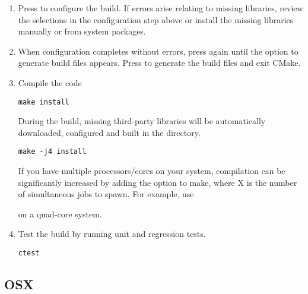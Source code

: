 \begin{enumerate}
    
    \item Press  to configure the build. If errors arise relating to
    missing libraries, review the  selections in
    the configuration step above or install the missing libraries manually or
    from system packages.
    
    \item When configuration completes without errors, press  again
    until the option  to generate build files appears. Press 
    to generate the build files and exit CMake.
    
    \item Compile the code
    \begin{lstlisting}[style=BashInputStyle]
        make install
    \end{lstlisting}
    During the build, missing third-party libraries will be automatically
    downloaded, configured and built in the \nekpp {} directory.
    
    \newsavebox\installationLinuxTip
    \begin{lrbox}{\installationLinuxTip}\begin{minipage}{0.8\linewidth}
    \begin{lstlisting}[style=BashInputStyle]
    make -j4 install
    \end{lstlisting}
    \end{minipage}
    \end{lrbox}
    
    \begin{tipbox}
    If you have multiple processors/cores on your system, compilation can be
    significantly increased by adding the  option to make, where X is
    the number of simultaneous jobs to spawn. For example, use
    
    \noindent\usebox\installationLinuxTip
    
    on a quad-core system.
    \end{tipbox}
    
    \item Test the build by running unit and regression tests.
    \begin{lstlisting}[style=BashInputStyle]
    ctest
    \end{lstlisting}
\end{enumerate}

\subsection{OSX}

